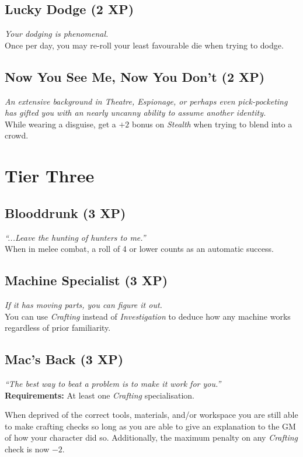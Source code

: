 \subsection*{Lucky Dodge (2 XP)}
\textit{Your dodging is phenomenal.}\\
Once per day, you may re-roll your least favourable die when trying to dodge.

\subsection*{Now You See Me, Now You Don't (2 XP)}
\textit{An extensive background in Theatre, Espionage, or perhaps even pick-pocketing has gifted you with an nearly uncanny ability to assume another identity.}\\
While wearing a disguise, get a $+2$ bonus on \textit{Stealth} when trying to blend into a crowd.

\section{Tier Three}

\subsection*{Blooddrunk (3 XP)}
\textit{``...Leave the hunting of hunters to me.''}\\
When in melee combat, a roll of 4 or lower counts as an automatic success.

\subsection*{Machine Specialist (3 XP)}
\textit{If it has moving parts, you can figure it out.}\\
You can use \textit{Crafting} instead of \textit{Investigation} to deduce how any machine works regardless of prior familiarity.

\subsection*{Mac's Back (3 XP)}
\textit{``The best way to beat a problem is to make it work for you.''}\\
\textbf{Requirements:} At least one \textit{Crafting} specialisation.

When deprived of the correct tools, materials, and/or workspace you are still able to make crafting checks so long as you are able to give an explanation to the GM of how your character did so.
Additionally, the maximum penalty on any \textit{Crafting} check is now $-2$.

